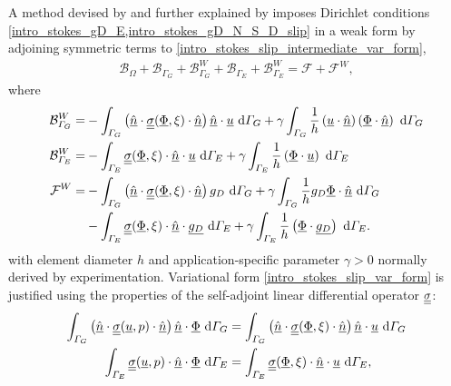 A method devised by  \citet{nitsche_1970/71} and further explained by \citet{freund_1995} imposes Dirichlet conditions \cref{intro_stokes_gD_E,intro_stokes_gD_N_S_D_slip} in a weak form by adjoining symmetric terms to \cref{intro_stokes_slip_intermediate_var_form},
\begin{align}
  \label{intro_stokes_slip_var_form}
  \mathcal{B}_{\Omega} + \mathcal{B}_{\Gamma_G} + \mathcal{B}_{\Gamma_G}^W + \mathcal{B}_{\Gamma_E} + \mathcal{B}_{\Gamma_E}^W = \mathcal{F} + \mathcal{F}^W,
\end{align}
where
{\footnotesize
\begin{align*}
  \mathcal{B}_{\varGamma_G}^W = &- \int_{\varGamma_G} \left( \underline{\hat{n}} \cdot \underline{\underline{\sigma}}(\underline{\Phi},\xi) \cdot \underline{\hat{n}} \right) \underline{\hat{n}} \cdot \underline{u}  \ \mathrm{d}\varGamma_G + \gamma \int_{\varGamma_G} \frac{1}{h} \left( \underline{u} \cdot \underline{\hat{n}} \right) \left( \underline{\Phi} \cdot \underline{\hat{n}} \right) \ \mathrm{d}\varGamma_G \\
  \mathcal{B}_{\varGamma_E}^W = &- \int_{\varGamma_E} \underline{\underline{\sigma}}(\underline{\Phi},\xi) \cdot \underline{\hat{n}} \cdot \underline{u} \ \mathrm{d}\varGamma_E + \gamma \int_{\varGamma_E} \frac{1}{h} \left( \underline{\Phi} \cdot \underline{u} \right) \ \mathrm{d}\varGamma_E \\
  \mathcal{F}^W = &- \int_{\varGamma_G} \left( \underline{\hat{n}} \cdot \underline{\underline{\sigma}}(\underline{\Phi},\xi) \cdot \underline{\hat{n}} \right) g_D \ \mathrm{d}\varGamma_G + \gamma \int_{\varGamma_G} \frac{1}{h} g_D \underline{\Phi} \cdot \underline{\hat{n}} \ \mathrm{d}\varGamma_G \\
  &- \int_{\varGamma_E} \underline{\underline{\sigma}}(\underline{\Phi},\xi) \cdot \underline{\hat{n}} \cdot \underline{g_D} \ \mathrm{d}\varGamma_E + \gamma \int_{\varGamma_E} \frac{1}{h} \left( \underline{\Phi} \cdot \underline{g_D} \right) \ \mathrm{d}\varGamma_E.
\end{align*}}
with element diameter $h$ and application-specific parameter $\gamma > 0$ normally derived by experimentation.  Variational form \cref{intro_stokes_slip_var_form} is justified using the properties of the self-adjoint linear differential operator $\underline{\underline{\sigma}}$:
\begin{align*}
  \int_{\varGamma_G} \left( \underline{\hat{n}} \cdot \underline{\underline{\sigma}}(\underline{u},p) \cdot \underline{\hat{n}} \right) \underline{\hat{n}} \cdot \underline{\Phi} \ \mathrm{d}\varGamma_G &= \int_{\varGamma_G} \left( \underline{\hat{n}} \cdot \underline{\underline{\sigma}}(\underline{\Phi},\xi) \cdot \underline{\hat{n}} \right) \underline{\hat{n}} \cdot \underline{u}  \ \mathrm{d}\varGamma_G \\
  \int_{\varGamma_E} \underline{\underline{\sigma}}(\underline{u},p) \cdot \underline{\hat{n}} \cdot \underline{\Phi} \ \mathrm{d}\varGamma_E &= \int_{\varGamma_E} \underline{\underline{\sigma}}(\underline{\Phi},\xi) \cdot \underline{\hat{n}} \cdot \underline{u} \ \mathrm{d}\varGamma_E,
\end{align*}
